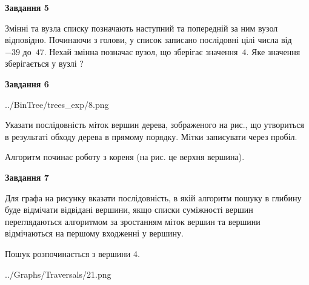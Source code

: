 \documentclass[12pt, ukrainian]{article}
\begin{document}
{\begin {large}
{\begin {center}\textbf{Завдання 5}\end {center}}\par
Змінні  та  вузла списку позначають наступний та попередній за ним вузол відповідно. Починаючи з голови, у список записано послідовні цілі числа від~$-39$ до~$47$. Нехай змінна  позначає вузол, що зберігає значення~$4$.
Яке значення зберігається у вузлі  ?\par
\newpage

{\begin {center}\textbf{Завдання 6}\end {center}}\par

\begin{center}
	{../BinTree/trees_exp/8.png}
\end{center}
Указати послідовність міток вершин дерева, зображеного на рис., що утвориться в результаті обходу дерева в прямому порядку. Мітки записувати через пробіл.\par Алгоритм починає роботу з кореня (на рис. це верхня вершина).\par
\newpage

{\begin {center}\textbf{Завдання 7}\end {center}}\par
Для графа на рисунку вказати послідовність, в якій алгоритм пошуку в глибину буде відмічати відвідані вершини, якщо списки суміжності вершин переглядаються алгоритмом за зростанням міток вершин та вершини відмічаються на першому вход\-женні у вершину.\par
Пошук розпочинається з вершини 4.\par

\begin{center}
	{../Graphs/Traversals/21.png}
\end{center}\par
\newpage


\end{large}}
\end{document}
